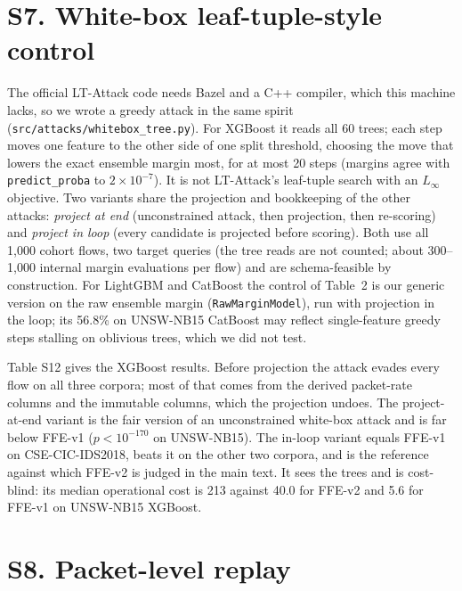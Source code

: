 \section*{S7. White-box leaf-tuple-style control}

The official LT-Attack code needs Bazel and a C++ compiler, which this machine lacks, so we wrote a greedy attack in the same spirit (\texttt{src/attacks/whitebox\_tree.py}). For XGBoost it reads all 60 trees; each step moves one feature to the other side of one split threshold, choosing the move that lowers the exact ensemble margin most, for at most 20 steps (margins agree with \texttt{predict\_proba} to $2\times10^{-7}$). It is not LT-Attack's leaf-tuple search with an $L_\infty$ objective. Two variants share the projection and bookkeeping of the other attacks: \emph{project at end} (unconstrained attack, then projection, then re-scoring) and \emph{project in loop} (every candidate is projected before scoring). Both use all 1,000 cohort flows, two target queries (the tree reads are not counted; about 300--1,000 internal margin evaluations per flow) and are schema-feasible by construction. For LightGBM and CatBoost the control of Table~2 is our generic version on the raw ensemble margin (\texttt{RawMarginModel}), run with projection in the loop; its 56.8\% on UNSW-NB15 CatBoost may reflect single-feature greedy steps stalling on oblivious trees, which we did not test.

\begin{table}[!htbp]
\centering
\caption*{Table S12. Real ASR (\%) of the XGBoost white-box control and FFE-v1; exact McNemar $p$ of the in-loop variant against FFE-v1 on the same 1,000 flows.}
\footnotesize

\end{table}

Table S12 gives the XGBoost results. Before projection the attack evades every flow on all three corpora; most of that comes from the derived packet-rate columns and the immutable columns, which the projection undoes. The project-at-end variant is the fair version of an unconstrained white-box attack and is far below FFE-v1 ($p<10^{-170}$ on UNSW-NB15). The in-loop variant equals FFE-v1 on CSE-CIC-IDS2018, beats it on the other two corpora, and is the reference against which FFE-v2 is judged in the main text. It sees the trees and is cost-blind: its median operational cost is 213 against 40.0 for FFE-v2 and 5.6 for FFE-v1 on UNSW-NB15 XGBoost.

\section*{S8. Packet-level replay}

